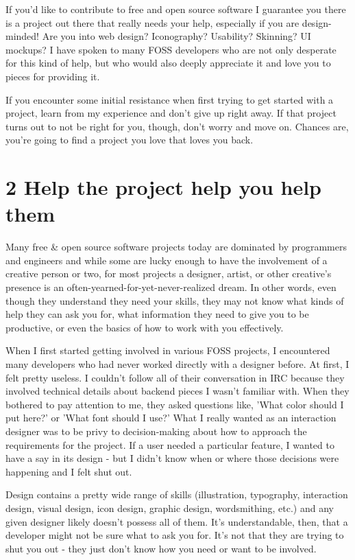 If you'd like to contribute to free and open source software I guarantee you
there is a project out there that really needs your help, especially if you are
design-minded! Are you into web design? Iconography? Usability? Skinning? UI
mockups? I have spoken to many FOSS developers who are not only desperate for
this kind of help, but who would also deeply appreciate it and love you to
pieces for providing it.

If you encounter some initial resistance when first trying to get started with a
project, learn from my experience and don't give up right away. If that project
turns out to not be right for you, though, don't worry and move on. Chances are,
you're going to find a project you love that loves you back.

\section*{2 Help the project help you help them}

Many free \& open source software projects today are dominated by programmers and
engineers and while some are lucky enough to have the involvement of a creative
person or two, for most projects a designer, artist, or other creative's
presence is an often-yearned-for-yet-never-realized dream. In other words, even
though they understand they need your skills, they may not know what kinds of
help they can ask you for, what information they need to give you to be
productive, or even the basics of how to work with you effectively. 

When I first started getting involved in various FOSS projects, I encountered
many developers who had never worked directly with a designer before. At first,
I felt pretty useless. I couldn't follow all of their conversation in IRC
because they involved technical details about backend pieces I wasn't familiar
with. When they bothered to pay attention to me, they asked questions like,
'What color should I put here?' or 'What font should I use?' What I really
wanted as an interaction designer was to be privy to decision-making about how
to approach the requirements for the project. If a user needed a particular
feature, I wanted to have a say in its design - but I didn't know when or where
those decisions were happening and I felt shut out.

Design contains a pretty wide range of skills (illustration, typography,
interaction design, visual design, icon design, graphic design, wordsmithing,
etc.) and any given designer likely doesn't possess all of them. It's
understandable, then, that a developer might not be sure what to ask you for.
It's not that they are trying to shut you out - they just don't know how you
need or want to be involved.

